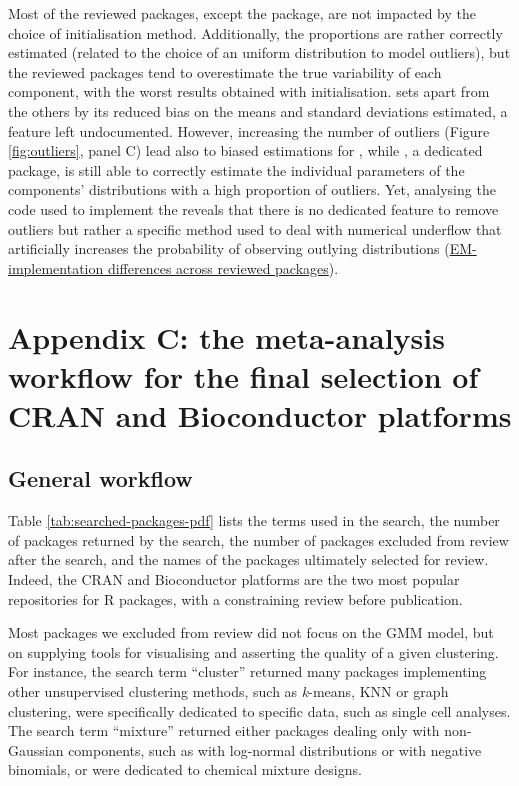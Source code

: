Most of the reviewed packages, except the  package, are not
impacted by the choice of initialisation method. Additionally, the
proportions are rather correctly estimated (related to the choice of an
uniform distribution to model outliers), but the reviewed packages tend
to overestimate the true variability of each component, with the worst
results obtained with  initialisation.  sets apart
from the others by its reduced bias on the means and standard deviations
estimated, a feature left undocumented. However, increasing the number
of outliers (Figure \ref{fig:outliers}, panel C) lead also to biased
estimations for , while , a dedicated package, is
still able to correctly estimate the individual parameters of the
components' distributions with a high proportion of outliers. Yet,
analysing the code used to implement the  reveals that there
is no dedicated feature to remove outliers but rather a specific method
used to deal with numerical underflow that artificially increases the
probability of observing outlying distributions (\protect\hyperlink{em-implementation-differences-across-reviewed-packages}{EM-implementation
differences across reviewed packages}).

\hypertarget{appendix-c-the-meta-analysis-workflow-for-the-final-selection-of-cran-and-bioconductor-platforms}{%
\section{Appendix C: the meta-analysis workflow for the final selection of CRAN and Bioconductor platforms}\label{appendix-c-the-meta-analysis-workflow-for-the-final-selection-of-cran-and-bioconductor-platforms}}

\hypertarget{general-workflow}{%
\subsection{General workflow}\label{general-workflow}}

Table \ref{tab:searched-packages-pdf}
lists the terms used in the search, the number of packages returned by
the search, the number of packages excluded from review after the
search, and the names of the packages ultimately selected for review.
Indeed, the CRAN and Bioconductor platforms are the two most popular
repositories for R packages, with a constraining review before
publication.

Most packages we excluded from review did not focus on the GMM model,
but on supplying tools for visualising and asserting the quality of a
given clustering. For instance, the search term ``cluster'' returned many
packages implementing other unsupervised clustering methods, such as
\emph{k}-means, KNN or graph clustering, were specifically dedicated to
specific data, such as single cell analyses. The search term ``mixture''
returned either packages dealing only with non-Gaussian components, such
as  with log-normal distributions or 
with negative binomials, or were dedicated to chemical mixture designs.

